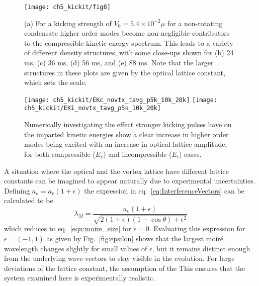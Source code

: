 \begin{figure}[ht]
    \centering
	\texttt{[image: ch5\_kickit/fig8]}
	\caption[Higher order modes induced by stronger kicking.]{(a) For a kicking strength of $V_0 = 5.4\times10^{-2}\mu$ for a non-rotating condensate higher order modes become non-negligible contributors to the compressible kinetic energy spectrum. This leads to a variety of different density structures, with some close-ups shown for (b) 24 ms, (c) 36 ms, (d) 56 ms, and (e) 88 ms. Note that the larger structures in these plots are given by the optical lattice constant, which sets the scale.}
	\label{fig:kickp20k}
\end{figure}
\begin{figure}[ht]
    \centering
    \texttt{[image: ch5\_kickit/EKc\_novtx\_tavg\_p5k\_10k\_20k]}
    \texttt{[image: ch5\_kickit/EKi\_novtx\_tavg\_p5k\_10k\_20k]}
	\caption[Comparison of kinetic energy spectra for increased kicking strengths.]{Numerically investigating the effect stronger kicking pulses have on the imparted kinetic energies show a clear increase in higher order modes being excited with an increase in optical lattice amplitude, for both compressible ($E_c$) and incompressible ($E_i$) cases.}\label{fig:kick_compare_spec}
\end{figure}

    A situation where the optical and the vortex lattice have different lattice constants can be imagined to appear naturally due to experimental uncertainties. Defining $a_o = a_v(1+\epsilon)$ the expression in eq.~\eqref{eq:InterferenceVectors} can be calculated to be
    \begin{equation}
    	\lambda_M = \frac{a_v(1+\epsilon)}{\sqrt{2(1+\epsilon)(1-\cos\theta) + \epsilon^2}}
    	\label{eqn:moire_size_eps}
    \end{equation}
    which reduces to eq.~\eqref{eqn:moire_size} for $\epsilon=0$. Evaluating this expression for $\epsilon = (-1,1)$ as given by Fig.~\ref{fig:epsilon} shows that the largest moir\'e wavelength changes slightly for small values of $\epsilon$, but it remains distinct enough from the underlying wave-vectors to stay visible in the evolution. For large deviations of the lattice constant, the assumption of the  This ensures that the system examined here is experimentally realistic.

